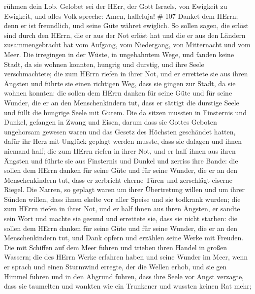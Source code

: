 rühmen dein Lob.  Gelobet sei der HErr, der Gott Israels,
von Ewigkeit zu Ewigkeit, und alles Volk spreche: Amen, halleluja! \#
107  Danket dem HErrn; denn er ist freundlich, und seine
Güte währet ewiglich.  So sollen sagen, die erlöst sind
durch den HErrn, die er aus der Not erlöst hat  und die er
aus den Ländern zusammengebracht hat vom Aufgang, vom Niedergang, von
Mitternacht und vom Meer.  Die irregingen in der Wüste, in
ungebahntem Wege, und fanden keine Stadt, da sie wohnen konnten,
 hungrig und durstig, und ihre Seele verschmachtete;
 die zum HErrn riefen in ihrer Not, und er errettete sie aus
ihren Ängsten  und führte sie einen richtigen Weg, dass sie
gingen zur Stadt, da sie wohnen konnten:  die sollen dem
HErrn danken für seine Güte und für seine Wunder, die er an den
Menschenkindern tut,  dass er sättigt die durstige Seele und
füllt die hungrige Seele mit Gutem.  Die da sitzen mussten
in Finsternis und Dunkel, gefangen in Zwang und Eisen, 
darum dass sie Gottes Geboten ungehorsam gewesen waren und das Gesetz
des Höchsten geschändet hatten,  dafür ihr Herz mit Unglück
geplagt werden musste, dass sie dalagen und ihnen niemand half;
 die zum HErrn riefen in ihrer Not, und er half ihnen aus
ihren Ängsten  und führte sie aus Finsternis und Dunkel und
zerriss ihre Bande:  die sollen dem HErrn danken für seine
Güte und für seine Wunder, die er an den Menschenkindern tut,
 dass er zerbricht eherne Türen und zerschlägt eiserne
Riegel.  Die Narren, so geplagt waren um ihrer Übertretung
willen und um ihrer Sünden willen,  dass ihnen ekelte vor
aller Speise und sie todkrank wurden;  die zum HErrn riefen
in ihrer Not, und er half ihnen aus ihren Ängsten,  er
sandte sein Wort und machte sie gesund und errettete sie, dass sie nicht
starben:  die sollen dem HErrn danken für seine Güte und
für seine Wunder, die er an den Menschenkindern tut,  und
Dank opfern und erzählen seine Werke mit Freuden.  Die mit
Schiffen auf dem Meer fuhren und trieben ihren Handel in großen Wassern;
 die des HErrn Werke erfahren haben und seine Wunder im
Meer,  wenn er sprach und einen Sturmwind erregte, der die
Wellen erhob,  und sie gen Himmel fuhren und in den Abgrund
fuhren, dass ihre Seele vor Angst verzagte,  dass sie
taumelten und wankten wie ein Trunkener und wussten keinen Rat mehr;
